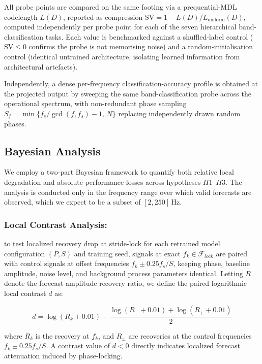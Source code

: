 All probe points are compared on the same footing via a prequential-MDL codelength $L(D)$, reported as compression $\mathrm{SV}=1-L(D)/L_{\mathrm{uniform}}(D)$, computed independently per probe point for each of the seven hierarchical band-classification tasks\cite{paganiPreliminaryInsightsChronos2026}. Each value is benchmarked against a shuffled-label control ($\mathrm{SV}\le 0$ confirms the probe is not memorising noise) and a random-initialisation control (identical untrained architecture, isolating learned information from architectural artefacts).

Independently, a dense per-frequency classification-accuracy profile is obtained at the projected output by sweeping the same band-classification probe across the operational spectrum, with non-redundant phase sampling $S_f=\min\{f_s/\gcd(f,f_s)-1,\,N\}$ replacing independently drawn random phases.

\subsection{Bayesian Analysis}
We employ a two-part Bayesian framework to quantify both relative local degradation and absolute performance losses across hypotheses $H1$--$H3$. The analysis is conducted only in the frequency range over which valid forecasts are observed, which we expect to be a subset of $[2,250]\,\mathrm{Hz}$.

\subsubsection{Local Contrast Analysis:} to test localized recovery drop at stride-lock for each retrained model configuration $(P, S)$ and training seed, signals at exact $f_k\in \mathcal F_{lock}$ are paired with control signals at offset frequencies $f_k \pm 0.25 f_s / S$, keeping phase, baseline amplitude, noise level, and background process parameters identical. Letting $R$ denote the forecast amplitude recovery ratio, we define the paired logarithmic local contrast $d$ as:

\begin{equation}
d 
= 
\log(R_k + 0.01) 
- 
\frac{\log(R_- + 0.01) 
+ 
\log(R_+ + 0.01)}{2}
\end{equation}

where $R_k$ is the recovery at $f_k$, and $R_{\pm}$ are recoveries at the control frequencies $f_k \pm 0.25 f_s / S$. A contrast value of $d < 0$ directly indicates localized forecast attenuation induced by phase-locking.

